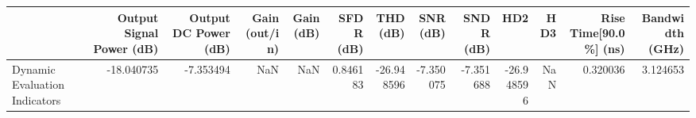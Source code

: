 \begin{tabular}{lrrrrrrrrrrrr}
\toprule
{} &  Output Signal Power (dB) &  Output DC Power (dB) &  Gain (out/in) &  Gain (dB) &  SFDR (dB) &   THD (dB) &  SNR (dB) &  SNDR (dB) &        HD2 &  HD3 &  Rise Time[90.0\%] (ns) &  Bandwidth (GHz) \\
\midrule
Dynamic Evaluation Indicators &                -18.040735 &             -7.353494 &            NaN &        NaN &   0.846183 & -26.948596 & -7.350075 &  -7.351688 & -26.948596 &  NaN &               0.320036 &         3.124653 \\
\bottomrule
\end{tabular}
